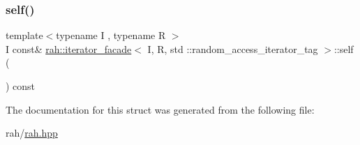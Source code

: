 \mbox{\label{structrah_1_1iterator__facade_3_01_i_00_01_r_00_01std_01_1_1random__access__iterator__tag_01_4_a8c4e4f5eb14eec47622cee38dcfd07ec}} 
\subsubsection{\texorpdfstring{self()}{self()}\hspace{0.1cm}{\footnotesize\ttfamily [2/2]}}
{\footnotesize\ttfamily template$<$typename I , typename R $>$ \\
I const\& \mbox{\hyperlink{structrah_1_1iterator__facade}{rah\+::iterator\+\_\+facade}}$<$ I, R, std \+::random\+\_\+access\+\_\+iterator\+\_\+tag $>$\+::self (\begin{DoxyParamCaption}{ }\end{DoxyParamCaption}) const\hspace{0.3cm}{\ttfamily [inline]}}



The documentation for this struct was generated from the following file\+:\begin{DoxyCompactItemize}
\item 
rah/\mbox{\hyperlink{rah_8hpp}{rah.\+hpp}}\end{DoxyCompactItemize}
